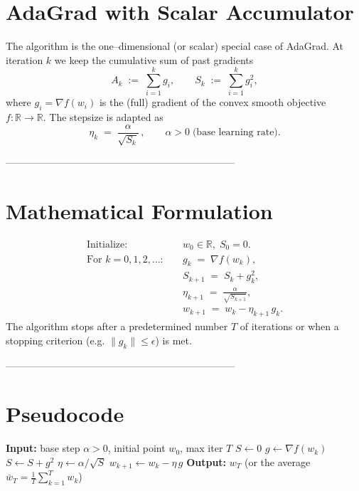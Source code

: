 \documentclass{article}
\begin{document}
\section*{AdaGrad with Scalar Accumulator}

The algorithm is the one–dimensional (or scalar) special case of AdaGrad.  
At iteration $k$ we keep the cumulative sum of past gradients
\[
A_k \;:=\; \sum_{i=1}^{k} g_i ,\qquad 
S_k \;:=\; \sum_{i=1}^{k} g_i^{2},
\]
where $g_i = \nabla f(w_i)$ is the (full) gradient of the convex smooth objective
$f:\mathbb{R}\rightarrow\mathbb{R}$.  
The stepsize is adapted as
\[
\eta_k \;=\; \frac{\alpha}{\sqrt{S_k}}\,,\qquad \alpha>0\;\text{(base learning rate)}.
\]

---------------------------------------------------------------------

\section*{Mathematical Formulation}
\begin{align}
\text{Initialize: }& w_0\in\mathbb{R},\; S_0=0. \label{eq:init}\\[4pt]
\text{For }k=0,1,2,\dots :\quad
& g_k \;=\; \nabla f(w_k), \label{eq:grad}\\
& S_{k+1} \;=\; S_k + g_k^{2}, \label{eq:acc}\\
& \eta_{k+1} \;=\; \frac{\alpha}{\sqrt{S_{k+1}}}, \label{eq:stepsize}\\
& w_{k+1} \;=\; w_k - \eta_{k+1} \, g_k . \label{eq:update}
\end{align}
The algorithm stops after a predetermined number $T$ of iterations or when a
stopping criterion (e.g. $\|g_k\|\le\epsilon$) is met.

---------------------------------------------------------------------

\section*{Pseudocode}
\begin{algorithm}[H]
\caption{Scalar AdaGrad}
\begin{algorithmic}[1]
\STATE \textbf{Input:} base step $\alpha>0$, initial point $w_0$, max iter $T$
\STATE $S\gets 0$ 
    \STATE $g \gets \nabla f(w_k)$
    \STATE $S \gets S + g^{2}$                         
    \STATE $\eta \gets \alpha / \sqrt{S}$               
    \STATE $w_{k+1} \gets w_k - \eta\, g$               
\ENDFOR
\STATE \textbf{Output:} $w_T$ (or the average $\bar w_T = \frac1T\sum_{k=1}^T w_k$)
\end{algorithmic}
\end{algorithm}
\end{document}
